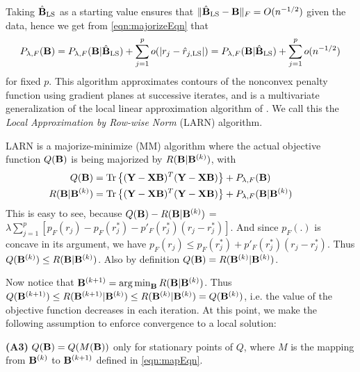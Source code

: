 Taking $\hat {{\mathbf{B}}}_{\text{LS}}$ as a starting value ensures that $\| \hat {{\mathbf{B}}}_{\text{LS}} - {\mathbf{B}} \|_F = O ( n^{-1/2} )$ given the data, hence we get from \ref{eqn:majorizeEqn} that
%
$$
P_{\lambda,F}({\mathbf{B}}) = P_{\lambda,F} ( {\mathbf{B}}|\hat {{\mathbf{B}}}_{\text{LS}} ) + \sum_{j=1}^p o( | r_j - \hat r_{j, \text{LS}} |) = P_{\lambda,F}({\mathbf{B}}| \hat {{\mathbf{B}}}_{\text{LS}} ) + \sum_{j=1}^p o( n^{-1/2} )
$$
%
for fixed $p$. This algorithm approximates contours of the nonconvex penalty function using gradient planes at successive iterates, and is a multivariate generalization of the local linear approximation algorithm of \cite{ZouLi08}. We call this the \textit{Local Approximation by Row-wise Norm} (LARN) algorithm.

LARN is a majorize-minimize (MM) algorithm where the actual objective function $Q({\mathbf{B}})$ is being majorized by $R ({\mathbf{B}} | {\mathbf{B}}^{(k)})$, with
%
\begin{align*}
\hspace{-2em} Q (\bfB) &= \Tr \left\{ (\bfY - \bfX\bfB)^T (\bfY - \bfX\bfB)\right\} + P_{\lambda,F} (\bfB)\\
\hspace{-2em} R (\bfB | \bfB^{(k)}) &= \Tr \left\{ (\bfY - \bfX\bfB)^T (\bfY - \bfX\bfB)\right\} 
 + P_{\lambda,F} (\bfB | \bfB^{(k)})
\end{align*} 
%
This is easy to see, because
%
$Q({\mathbf{B}}) - R({\mathbf{B}}|{\mathbf{B}}^{(k)})$
 = 
 $\lambda \sum_{j=1}^p \left[ p_F (r_j) - p_F (r_j^*) - p'_F (r_j^*) (r_j - r_j^*) \right]$.
%
And since $p_F(.)$ is concave in its argument, we have $p_F (r_j) \leq p_F (r_j^*) + p'_F (r_j^*) (r_j - r_j^*)$. Thus $Q({\mathbf{B}}^{(k)}) \leq R({\mathbf{B}}|{\mathbf{B}}^{(k)})$. Also by definition $Q({\mathbf{B}}) = R({\mathbf{B}}^{(k)}|{\mathbf{B}}^{(k)})$.

Now notice that ${\mathbf{B}}^{(k+1)} = \operatorname*{arg\,min}_{\mathbf{B}} R({\mathbf{B}}|{\mathbf{B}}^{(k)})$. Thus $Q({\mathbf{B}}^{(k+1)}) \leq R({\mathbf{B}}^{(k+1)}|{\mathbf{B}}^{(k)}) \leq R({\mathbf{B}}^{(k)}|{\mathbf{B}}^{(k)}) = Q({\mathbf{B}}^{(k)}) $, i.e. the value of the objective function decreases in each iteration. At this point, we make the following assumption to enforce convergence to a local solution:

\vspace{1em}
\noindent\textbf{(A3)} $Q({\mathbf{B}})=Q(M({\mathbf{B}}))$ only for stationary points of $Q$, where $M$ is the mapping from ${\mathbf{B}}^{(k)}$ to ${\mathbf{B}}^{(k+1)}$ defined in \ref{eqn:mapEqn}.
\vspace{1em}

